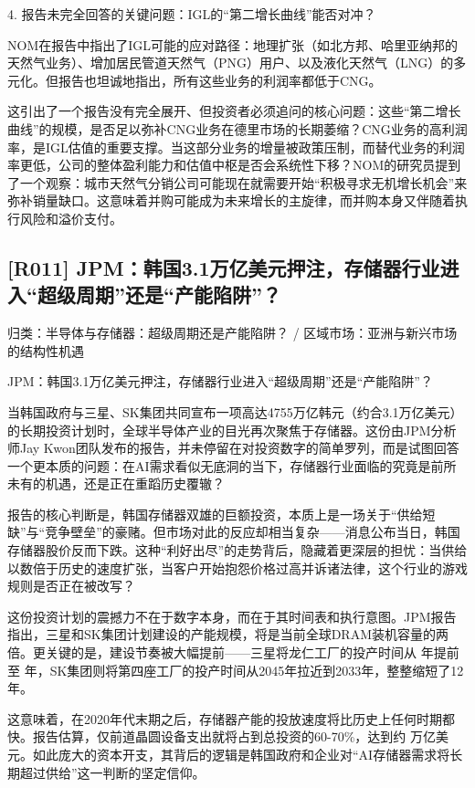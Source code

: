 \documentclass[11pt]{ctexart}
\begin{document}
4. 报告未完全回答的关键问题：IGL的“第二增长曲线”能否对冲？

NOM在报告中指出了IGL可能的应对路径：地理扩张（如北方邦、哈里亚纳邦的天然气业务）、增加居民管道天然气（PNG）用户、以及液化天然气（LNG）的多元化。但报告也坦诚地指出，所有这些业务的利润率都低于CNG。

这引出了一个报告没有完全展开、但投资者必须追问的核心问题：这些“第二增长曲线”的规模，是否足以弥补CNG业务在德里市场的长期萎缩？CNG业务的高利润率，是IGL估值的重要支撑。当这部分业务的增量被政策压制，而替代业务的利润率更低，公司的整体盈利能力和估值中枢是否会系统性下移？NOM的研究员提到了一个观察：城市天然气分销公司可能现在就需要开始“积极寻求无机增长机会”来弥补销量缺口。这意味着并购可能成为未来增长的主旋律，而并购本身又伴随着执行风险和溢价支付。

\subsection{[R011] JPM：韩国3.1万亿美元押注，存储器行业进入“超级周期”还是“产能陷阱”？}
{\small\color{refgray}归类：半导体与存储器：超级周期还是产能陷阱？ / 区域市场：亚洲与新兴市场的结构性机遇}

JPM：韩国3.1万亿美元押注，存储器行业进入“超级周期”还是“产能陷阱”？

当韩国政府与三星、SK集团共同宣布一项高达4755万亿韩元（约合3.1万亿美元）的长期投资计划时，全球半导体产业的目光再次聚焦于存储器。这份由JPM分析师Jay Kwon团队发布的报告，并未停留在对投资数字的简单罗列，而是试图回答一个更本质的问题：在AI需求看似无底洞的当下，存储器行业面临的究竟是前所未有的机遇，还是正在重蹈历史覆辙？

报告的核心判断是，韩国存储器双雄的巨额投资，本质上是一场关于“供给短缺”与“竞争壁垒”的豪赌。但市场对此的反应却相当复杂——消息公布当日，韩国存储器股价反而下跌。这种“利好出尽”的走势背后，隐藏着更深层的担忧：当供给以数倍于历史的速度扩张，当客户开始抱怨价格过高并诉诸法律，这个行业的游戏规则是否正在被改写？

这份投资计划的震撼力不在于数字本身，而在于其时间表和执行意图。JPM报告指出，三星和SK集团计划建设的产能规模，将是当前全球DRAM装机容量的两倍。更关键的是，建设节奏被大幅提前——三星将龙仁工厂的投产时间从 年提前至 年，SK集团则将第四座工厂的投产时间从2045年拉近到2033年，整整缩短了12年。

这意味着，在2020年代末期之后，存储器产能的投放速度将比历史上任何时期都快。报告估算，仅前道晶圆设备支出就将占到总投资的60-70\%，达到约 万亿美元。如此庞大的资本开支，其背后的逻辑是韩国政府和企业对“AI存储器需求将长期超过供给”这一判断的坚定信仰。
\end{document}
